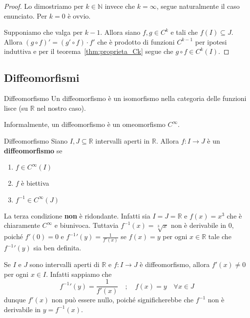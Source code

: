 \begin{proof}
    Lo dimostriamo per \(k \in \mathbb{N}\) invece che \(k = \infty\), segue
    naturalmente il caso enunciato. Per \(k = 0\) è ovvio.

    Supponiamo che valga per \(k-1\). Allora siano \(f, g \in C^{k}\) e
    tali che \(f{(I)} \subseteq J \). Allora \({(g \circ f)}' = {(g' \circ f)}
    \cdot f'\) che è prodotto di funzioni \(C^{k-1}\) per ipotesi induttiva e
    per il teorema~\ref{thm:proprieta_Ck} segue che \(g \circ f \in C^{k}{(I)}\).
\end{proof}

\subsection{Diffeomorfismi}
\begin{definition}{Diffeomorfismo}
    Un diffeomorfismo è un isomorfismo nella categoria delle funzioni lisce (su
    \(\mathbb{R}\) nel nostro caso). 
\end{definition}
Informalmente, un diffeomorfismo è un omeomorfismo \(C^{\infty}\). 
\begin{definition}{Diffeomorfismo}
    Siano \(I, J \subseteq \mathbb{R} \) intervalli aperti in \(\mathbb{R}\).
    Allora \(f : I \to J\) è un \textbf{diffeomorfismo} se
\begin{enumerate}[label = \arabic*.]
    \item \(f \in C^{\infty}{(I)}\) 
    \item \(f\) è biettiva
    \item \(f^{-1} \in C^{\infty}{(J)}\)
\end{enumerate}
\end{definition}
\begin{remark}
    La terza condizione \textbf{non} è ridondante. Infatti sia \(I = J =
    \mathbb{R}\) e \(f{(x)} = x^{3}\) che è chiaramente \(C^{\infty}\) e
    biunivoca. Tuttavia \(f^{-1}{(x)} = \sqrt[3]{x}\) non è derivabile in \(0\),
poiché \(f'(0) = 0\) e \({f^{-1}}'(y) = \frac{1}{f'{(x)}}\) se \(f{(x)} = y\)
per ogni \(x \in \mathbb{R}\) tale che \({f^{-1}}'{(y)}\) sia ben definita.
\end{remark}
\begin{remark}
    Se \(I\) e \(J\) sono intervalli aperti di \(\mathbb{R}\) e \(f : I\to J\) è
    diffeomorfismo, allora \(f'{(x)} \neq 0\) per ogni \(x \in I\). Infatti
    sappiamo che
    \begin{equation}\label{eq:derivata_inversa}
        {f^{-1}}'(y) = \frac{1}{f'{(x)}} \quad ; \quad f{(x)} = y \quad
        \forall x \in J 
    \end{equation}
    dunque \(f'{(x)}\) non può essere nullo, poiché significherebbe che
    \(f^{-1}\) non è derivabile in \(y = f^{-1}{(x)}\).
\end{remark}
